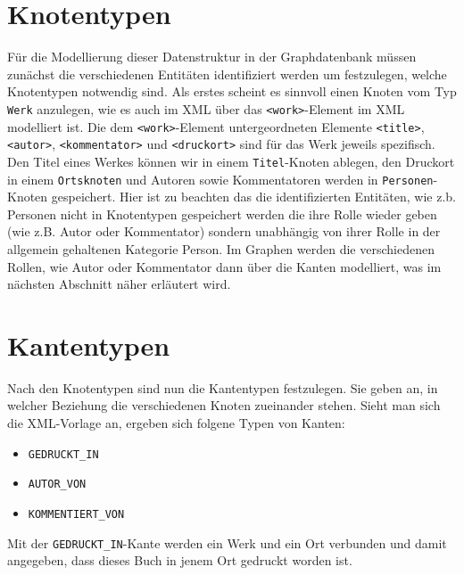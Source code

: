 \documentclass[ngerman,]{scrreprt}
\providecommand{\tightlist}{%
  \setlength{\itemsep}{0pt}\setlength{\parskip}{0pt}}
\begin{document}
\section{Knotentypen}\label{knotentypen}

Für die Modellierung dieser Datenstruktur in der Graphdatenbank müssen zunächst die verschiedenen Entitäten identifiziert werden um festzulegen, welche Knotentypen notwendig sind. Als erstes scheint es sinnvoll einen Knoten vom Typ \texttt{Werk} anzulegen, wie es auch im XML über das \texttt{\textless{}work\textgreater{}}-Element im XML modelliert ist. Die dem \texttt{\textless{}work\textgreater{}}-Element untergeordneten Elemente \texttt{\textless{}title\textgreater{}}, \texttt{\textless{}autor\textgreater{}}, \texttt{\textless{}kommentator\textgreater{}} und \texttt{\textless{}druckort\textgreater{}} sind für das Werk jeweils spezifisch. Den Titel eines Werkes können wir in einem \texttt{Titel}-Knoten ablegen, den Druckort in einem \texttt{Ortsknoten} und Autoren sowie Kommentatoren werden in \texttt{Personen}-Knoten gespeichert. Hier ist zu beachten das die identifizierten Entitäten, wie z.b. Personen nicht in Knotentypen gespeichert werden die ihre Rolle wieder geben (wie z.B. Autor oder Kommentator) sondern unabhängig von ihrer Rolle in der allgemein gehaltenen Kategorie Person. Im Graphen werden die verschiedenen Rollen, wie Autor oder Kommentator dann über die Kanten modelliert, was im nächsten Abschnitt näher erläutert wird.

\section{Kantentypen}\label{kantentypen}

Nach den Knotentypen sind nun die Kantentypen festzulegen. Sie geben an, in welcher Beziehung die verschiedenen Knoten zueinander stehen. Sieht man sich die XML-Vorlage an, ergeben sich folgene Typen von Kanten:

\begin{itemize}
\tightlist
\item
  \texttt{GEDRUCKT\_IN}
\item
  \texttt{AUTOR\_VON}
\item
  \texttt{KOMMENTIERT\_VON}
\end{itemize}

Mit der \texttt{GEDRUCKT\_IN}-Kante werden ein Werk und ein Ort verbunden und damit angegeben, dass dieses Buch in jenem Ort gedruckt worden ist.
\end{document}
